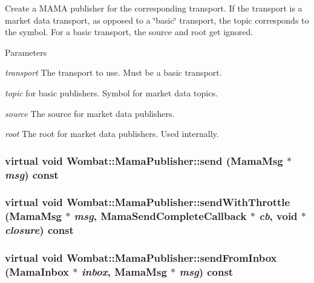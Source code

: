 Create a MAMA publisher for the corresponding transport. If the transport is a market data transport, as opposed to a \char`\"{}basic\char`\"{} transport, the topic corresponds to the symbol. For a basic transport, the source and root get ignored.


\begin{DoxyParams}{Parameters}
\item[{\em transport}]The transport to use. Must be a basic transport. \item[{\em topic}]for basic publishers. Symbol for market data topics. \item[{\em source}]The source for market data publishers. \item[{\em root}]The root for market data publishers. Used internally. \end{DoxyParams}
\hypertarget{classWombat_1_1MamaPublisher_a8384dd52952a2ce0e178799e1ec380c9}{
\subsubsection[{send}]{\setlength{\rightskip}{0pt plus 5cm}virtual void Wombat::MamaPublisher::send ({\bf MamaMsg} $\ast$ {\em msg}) const}}
\label{classWombat_1_1MamaPublisher_a8384dd52952a2ce0e178799e1ec380c9}
\hypertarget{classWombat_1_1MamaPublisher_a77970e88c69a850c451d36fcb5c720cd}{
\subsubsection[{sendWithThrottle}]{\setlength{\rightskip}{0pt plus 5cm}virtual void Wombat::MamaPublisher::sendWithThrottle ({\bf MamaMsg} $\ast$ {\em msg}, \/  {\bf MamaSendCompleteCallback} $\ast$ {\em cb}, \/  void $\ast$ {\em closure}) const}}
\label{classWombat_1_1MamaPublisher_a77970e88c69a850c451d36fcb5c720cd}
\hypertarget{classWombat_1_1MamaPublisher_aa50cc252ba9a6ac329fb5e3075be304b}{
\subsubsection[{sendFromInbox}]{\setlength{\rightskip}{0pt plus 5cm}virtual void Wombat::MamaPublisher::sendFromInbox ({\bf MamaInbox} $\ast$ {\em inbox}, \/  {\bf MamaMsg} $\ast$ {\em msg}) const}}
